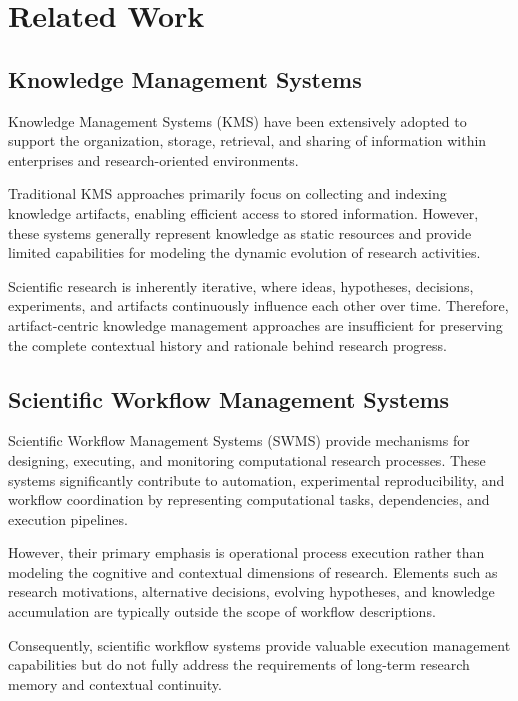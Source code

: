 \section{Related Work}
\label{sec:related_work}

\subsection{Knowledge Management Systems}

Knowledge Management Systems (KMS) have been extensively adopted to support the organization, storage, retrieval, and sharing of information within enterprises and research-oriented environments.

Traditional KMS approaches primarily focus on collecting and indexing knowledge artifacts, enabling efficient access to stored information. However, these systems generally represent knowledge as static resources and provide limited capabilities for modeling the dynamic evolution of research activities.

Scientific research is inherently iterative, where ideas, hypotheses, decisions, experiments, and artifacts continuously influence each other over time. Therefore, artifact-centric knowledge management approaches are insufficient for preserving the complete contextual history and rationale behind research progress.


\subsection{Scientific Workflow Management Systems}

Scientific Workflow Management Systems (SWMS) provide mechanisms for designing, executing, and monitoring computational research processes. These systems significantly contribute to automation, experimental reproducibility, and workflow coordination by representing computational tasks, dependencies, and execution pipelines.

However, their primary emphasis is operational process execution rather than modeling the cognitive and contextual dimensions of research. Elements such as research motivations, alternative decisions, evolving hypotheses, and knowledge accumulation are typically outside the scope of workflow descriptions.

Consequently, scientific workflow systems provide valuable execution management capabilities but do not fully address the requirements of long-term research memory and contextual continuity.



